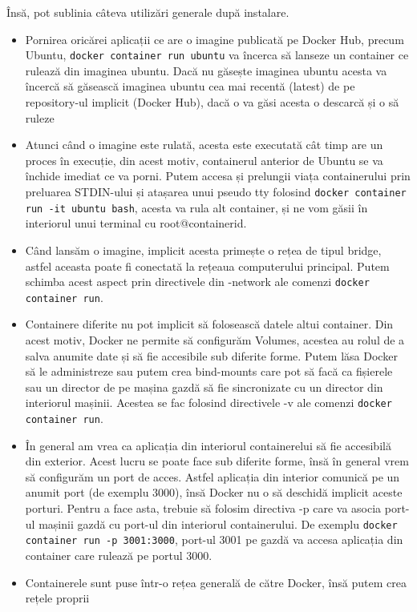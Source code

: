 Însă, pot sublinia câteva utilizări generale după instalare.

\begin{itemize}
    \item Pornirea oricărei aplicații ce are o imagine publicată pe Docker Hub,
precum Ubuntu, \verb|docker container run ubuntu| va încerca să lanseze un container 
ce rulează din imaginea ubuntu. Dacă nu găsește imaginea ubuntu acesta va încercă să
găsească imaginea ubuntu cea mai recentă (latest) de pe repository-ul implicit (Docker Hub),
dacă o va găsi acesta o descarcă și o să ruleze
    \item Atunci când o imagine este rulată, acesta este executată cât timp are un proces în execuție,
din acest motiv, containerul anterior de Ubuntu se va închide imediat ce va porni. Putem accesa 
și prelungii viața containerului prin preluarea STDIN-ului și atașarea unui pseudo tty folosind
\verb|docker container run -it ubuntu bash|, acesta va rula alt container, și ne vom găsii
în interiorul unui terminal cu root@containerid.
    \item Când lansăm o imagine, implicit acesta primește o rețea de tipul bridge, astfel 
aceasta poate fi conectată la rețeaua computerului principal. Putem schimba acest aspect
prin directivele din -network ale comenzi \verb|docker container run|.
    \item Containere diferite nu pot implicit să folosească datele altui container. Din acest motiv,
Docker ne permite să configurăm Volumes, acestea au rolul de a salva anumite date și să fie accesibile
sub diferite forme. Putem lăsa Docker să le administreze sau putem crea bind-mounts care pot să facă 
ca fișierele sau un director de pe mașina gazdă să fie sincronizate cu un director din interiorul mașinii.
Acestea se fac folosind directivele -v ale comenzi \verb|docker container run|.
    \item În general am vrea ca aplicația din interiorul containerelui să fie accesibilă din exterior. Acest lucru
se poate face sub diferite forme, însă în general vrem să configurăm un port de acces. Astfel aplicația
din interior comunică pe un anumit port (de exemplu 3000), însă Docker nu o să deschidă implicit aceste 
porturi. Pentru a face asta, trebuie să folosim directiva -p care va asocia port-ul mașinii gazdă cu port-ul
din interiorul containerului. De exemplu \verb|docker container run -p 3001:3000|, port-ul 3001 pe gazdă va accesa aplicația din container
care rulează pe portul 3000.
    \item Containerele sunt puse într-o rețea generală de către Docker, însă putem crea rețele proprii 

\end{itemize}
